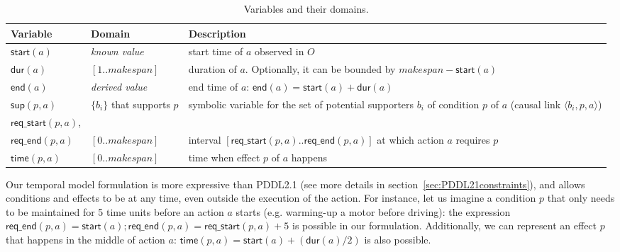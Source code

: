 \documentclass{ecai}
\newcommand{\tup}[1]{{\langle #1 \rangle}}
\newcommand{\dur}{\mathsf{dur}}    %
\newcommand{\start}{\mathsf{start}}%
\newcommand{\en}{\mathsf{end}}     %
\newcommand{\supp}{\mathsf{sup}}   %
\newcommand{\tim}{\mathsf{time}}   %
\newcommand{\reqs}{\mathsf{req\_{start}}} %
\newcommand{\reqe}{\mathsf{req\_{end}}}   %
\begin{document}
\begin{table}
\begin{tiny}
\small
\begin{tabular}{p{2cm}p{2.7cm}p{7.4cm}}
Variable & Domain & Description \\

\hline


$\start(a)$ & \emph{known value} & start time of $a$ observed in $O$ \\
$\dur(a)$ & $[1..makespan]$ & duration of $a$. Optionally, it can be bounded by $makespan-\start(a)$\\
$\en(a)$ & \emph{derived value} & end time of $a$: $\en(a)=\start(a)+\dur(a)$ \\


$\supp(p,a)$ & $\{b_i\}$ that \newline supports $p$ & symbolic variable for the set of potential supporters $b_i$ of condition $p$ of $a$ (causal link $\tup{b_i,p,a}$) \\

$\reqs(p,a)$, \\
$\reqe(p,a)$ & $[0..makespan]$ & interval $[\reqs(p,a)..\reqe(p,a)]$ at which action $a$ requires $p$ \\

$\tim(p,a)$ & $[0..makespan]$ & time when effect $p$ of $a$ happens \\


\hline
\end{tabular}
\normalsize
\end{tiny}
\caption{\small Variables and their domains.}
\label{table:variables}
\end{table}



Our temporal model formulation is more expressive than PDDL2.1 (see more details in section~\ref{sec:PDDL21constraints}), and allows conditions and effects to be at any time, even outside the execution of the action. For instance, let us imagine a condition $p$ that only needs to be maintained for 5 time units before an action $a$ starts (e.g. warming-up a motor before driving): the expression $\reqe(p,a)=\start(a); \reqe(p,a) = \reqs(p,a)+5$ is possible in our formulation. Additionally, we can represent an effect $p$ that happens in the middle of action $a$: $\tim(p,a) = \start(a)+ (\dur(a) / 2)$ is also possible.
\end{document}
